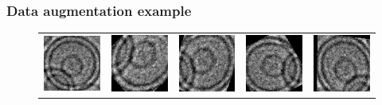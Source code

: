 \documentclass{beamer}
\begin{document}
\begin{frame}
\frametitle{Data augmentation example}
\begin{figure}
\centering
\begin{tabular}{ccccc}
\includegraphics[scale=0.5]{augmented/541253.jpg} & \includegraphics[scale=0.5]{augmented/_0_645.jpeg} & \includegraphics[scale=0.5]{augmented/_0_1385.jpeg} & \includegraphics[scale=0.5]{augmented/_0_1749.jpeg} & \includegraphics[scale=0.5]{augmented/_0_2343.jpeg} \\


\end{tabular}
\end{figure}
\end{frame}
\end{document}
